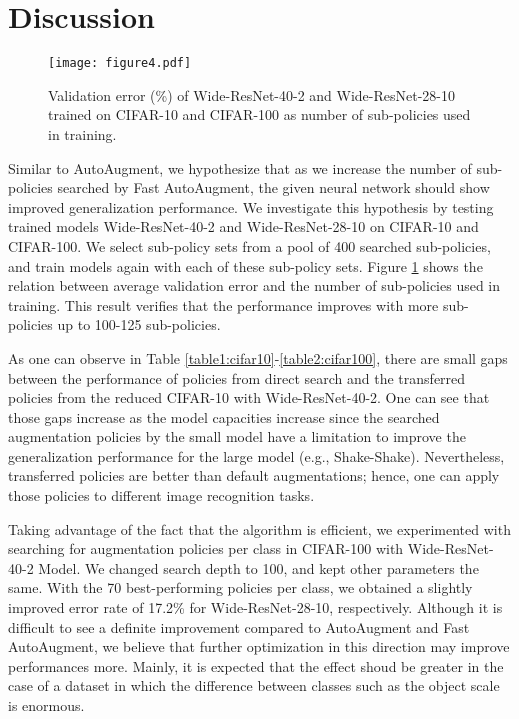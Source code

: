 \documentclass{article}
\begin{document}
\section{Discussion}


 \begin{figure}
     \centering
     \texttt{[image: figure4.pdf]}

     \caption{Validation error (\%) of Wide-ResNet-40-2 and Wide-ResNet-28-10 trained on CIFAR-10 and CIFAR-100 as number of sub-policies used in training. }
     \label{fig:number-of-policy}
 \end{figure}


Similar to AutoAugment, we hypothesize that as we increase the number of sub-policies searched by Fast AutoAugment, the given neural network should show improved generalization performance. We investigate this hypothesis by testing trained models Wide-ResNet-40-2 and Wide-ResNet-28-10 on CIFAR-10 and CIFAR-100. We select sub-policy sets from a pool of 400 searched sub-policies, and train models again with each of these sub-policy sets. Figure \ref{fig:number-of-policy} shows the relation between average validation error and the number of sub-policies used in training. This result verifies that the performance improves with more sub-policies up to 100-125 sub-policies.

As one can observe in Table \ref{table1:cifar10}-\ref{table2:cifar100}, there are small gaps between the performance of policies from direct search and the transferred policies from the reduced CIFAR-10 with Wide-ResNet-40-2. One can see that those gaps increase as the model capacities increase since the searched augmentation policies by the small model have a limitation to improve the generalization performance for the large model (e.g., Shake-Shake). Nevertheless, transferred policies are better than default augmentations; hence, one can apply those policies to different image recognition tasks. 

















Taking advantage of the fact that the algorithm is efficient, we experimented with searching for augmentation policies per class in CIFAR-100 with Wide-ResNet-40-2 Model. We changed search depth  to 100, and kept other parameters the same. With the 70 best-performing policies per class, we obtained a slightly improved error rate of 17.2\% for  Wide-ResNet-28-10, respectively. Although it is difficult to see a definite improvement compared to AutoAugment and Fast AutoAugment, we believe that further optimization in this direction may improve performances more. Mainly, it is expected that the effect shoud be greater in the case of a dataset in which the difference between classes such as the object scale is enormous.
\end{document}
